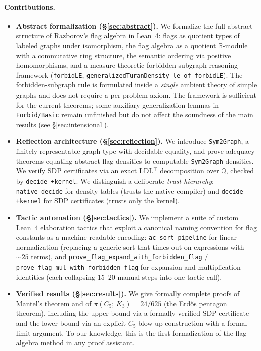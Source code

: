 \documentclass{article}
\newcommand{\tdensity}[2]{\pi(#1;\,#2)}
\newcommand{\lean}[1]{\texttt{#1}}
\begin{document}
\paragraph{Contributions.}
\begin{itemize}
  \item \textbf{Abstract formalization (\S\ref{sec:abstract}).}
    We formalize the full abstract structure of Razborov's flag algebra in
    Lean~4: flags as quotient types of labeled graphs under isomorphism,
    the flag algebra as a quotient $\mathbb{R}$-module with a commutative ring
    structure, the semantic ordering via positive homomorphisms, and a
    measure-theoretic forbidden-subgraph reasoning framework
    (\lean{forbidLE}, \lean{generalizedTuranDensity\_le\_of\_forbidLE}).
    The forbidden-subgraph rule is formulated inside a \emph{single} ambient
    theory of simple graphs and does not require a per-problem axiom.
    The framework is sufficient for the current theorems; some auxiliary
    generalization lemmas in \lean{Forbid/Basic} remain unfinished but do
    not affect the soundness of the main results (see \S\ref{sec:intensional}).

  \item \textbf{Reflection architecture (\S\ref{sec:reflection}).}
    We introduce \lean{Sym2Graph}, a finitely-representable graph type with
    decidable equality, and prove adequacy theorems equating abstract flag
    densities to computable \lean{Sym2Graph} densities.  We verify SDP
    certificates via an exact LDL$^\top$ decomposition over $\mathbb{Q}$,
    checked by \lean{decide +kernel}.  We distinguish a deliberate
    \emph{trust hierarchy}: \lean{native\_decide} for density tables (trusts
    the native compiler) and \lean{decide +kernel} for SDP certificates
    (trusts only the kernel).

  \item \textbf{Tactic automation (\S\ref{sec:tactics}).}
    We implement a suite of custom Lean~4 elaboration tactics that exploit a
    canonical naming convention for flag constants as a machine-readable
    encoding: \lean{ac\_sort\_pipeline} for linear normalization (replacing a
    generic sort that times out on expressions with $\sim\!25$ terms),
    and \lean{prove\_flag\_expand\_with\_forbidden\_flag} /
    \lean{prove\_flag\_mul\_with\_forbidden\_flag} for expansion and
    multiplication identities (each collapsing 15--20 manual steps into one
    tactic call).

  \item \textbf{Verified results (\S\ref{sec:results}).}
    We give formally complete proofs of Mantel's theorem and of
    $\tdensity{C_5}{K_3} = 24/625$ (the Erd\H{o}s pentagon theorem), including
    the upper bound via a formally verified SDP certificate and the lower bound
    via an explicit $C_5$-blow-up construction with a formal limit argument.
    To our knowledge, this is the first formalization of the flag algebra method
    in any proof assistant.
\end{itemize}
\end{document}
